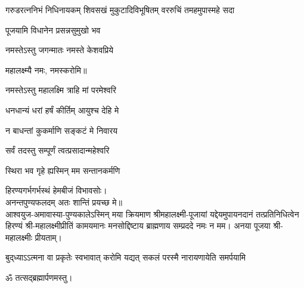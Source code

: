 
{गरुडरत्ननिभं निधिनायकम्}
{शिवसखं मुकुटादिविभूषितम्}
{वररुचिं तमहमुपास्महे सदा}

{पूजयामि विधानेन प्रसन्नसुमुखो भव}

\begingroup
\centering
\setlength{\columnseprule}{1pt}
\let\chapt\sect


\endgroup



{नमस्तेऽस्तु जगन्मातः नमस्ते केशवप्रिये}

महालक्ष्म्यै नमः, नमस्करोमि॥


{नमस्तेऽस्तु महालक्ष्मि त्राहि मां परमेश्वरि}

{धनधान्यं धरां हर्षं कीर्तिम् आयुश्च देहि मे}

{न बाधन्तां कुकर्माणि सङ्कटं मे निवारय}


{सर्वं तदस्तु सम्पूर्णं त्वत्प्रसादान्महेश्वरि}

{स्थिरा भव गृहे ह्यस्मिन् मम सन्तानकर्मणि}

हिरण्यगर्भगर्भस्थं हेमबीजं विभावसोः।\\
अनन्तपुण्यफलदम् अतः शान्तिं प्रयच्छ मे॥\\

आश्वयुज-अमावास्या-पुण्यकालेऽस्मिन् मया क्रियमाण श्री\-महा\-लक्ष्मी-पूजायां
यद्देयमुपायन\-दानं तत्प्रति\-निधित्वेन हिरण्यं श्री-महा\-लक्ष्मी\-प्रीतिं
कामयमानः मनसोद्दिष्टाय ब्राह्मणाय सम्प्रददे नमः न मम। 
अनया पूजया श्री-महालक्ष्मीः प्रीयताम्। 



{बुद्‌ध्याऽऽत्मना वा प्रकृतेः स्वभावात्}
{करोमि यद्यत् सकलं परस्मै}
{नारायणायेति समर्पयामि}

ॐ तत्सद्ब्रह्मार्पणमस्तु।